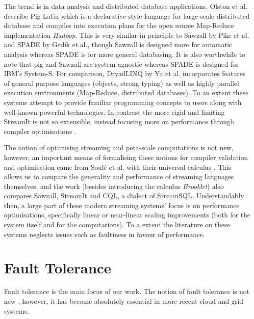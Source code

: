 The trend is in data analysis and distributed database applications.
Olston et al. describe Pig Latin \cite{ols08} which is a declarative-style language for large-scale distributed database and compiles into execution plans for the open source Map-Reduce implementation {\em Hadoop}.
This is very similar in principle to Sawzall \cite{pik05} by Pike et al. and SPADE \cite{ged08} by Gedik et al., though Sawzall is designed more for automatic analysis whereas SPADE is for more general databasing.
It is also worthwhile to note that pig and Sawzall are system agnostic whereas SPADE is designed for IBM's System-S.
For comparison, DryadLINQ \cite{yu08} by Yu et al. incorporates features of general purpose languages (objects, strong typing) as well as highly parallel execution environments (Map-Reduce, distributed databases).
To an extent these systems attempt to provide familiar programming concepts to users along with well-known powerful technologies.
In contrast the more rigid and limiting StreamIt is not so extensible, instead focusing more on performance through compiler optimisations \cite{thies01}.

The notion of optimising streaming and peta-scale computations is not new, however, an important means of formalising these notions for compiler validation and optimisation came from Soul{\'e} et al. with their universal calculus \cite{sou10}.
This allows us to compare the generality and performance of streaming languages themselves, and the work (besides introducing the calculus {\em Brooklet}) also compares Sawzall, StreamIt and CQL, a dialect of StreamSQL.
Understandably then, a large part of these modern streaming systems' focus is on performance optimisations, specifically linear or near-linear scaling improvements (both for the system itself and for the computations).
To a extent the literature on these systems neglects issues such as faultiness in favour of performance.

\section{Fault Tolerance}

Fault tolerance is the main focus of our work.
The notion of fault tolerance is not new \cite{ran75}, however, it has become absolutely essential in more recent cloud and grid systems.

